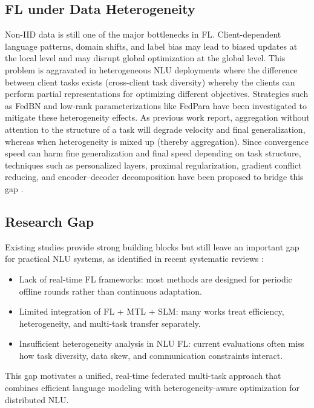\subsection{FL under Data Heterogeneity}
Non-IID data is still one of the major bottlenecks in FL. Client-dependent language patterns, domain shifts, and label bias may lead to biased updates at the local level and may disrupt global optimization at the global level. This problem is aggravated in heterogeneous NLU deployments where the difference between client tasks exists (cross-client task diversity) whereby the clients can perform partial representations for optimizing different objectives. Strategies such as FedBN \cite{li2021fedbn} and low-rank parameterizations like FedPara \cite{huo2022fedpara} have been investigated to mitigate these heterogeneity effects. As previous work report, aggregation without attention to the structure of a task will degrade velocity and final generalization, whereas when heterogeneity is mixed up (thereby aggregation). Since convergence speed can harm fine generalization and final speed depending on task structure, techniques such as personalized layers, proximal regularization, gradient conflict reducing, and encoder--decoder decomposition have been proposed to bridge this gap \cite{li2020fedprox,yu2020pcgrad,zhou2025mfed}.

\subsection{Research Gap}
Existing studies provide strong building blocks but still leave an important gap for practical NLU systems, as identified in recent systematic reviews \cite{khan2024systematic}:
\begin{itemize}
    \item Lack of real-time FL frameworks: most methods are designed for periodic offline rounds rather than continuous adaptation.
    \item Limited integration of FL + MTL + SLM: many works treat efficiency, heterogeneity, and multi-task transfer separately.
    \item Insufficient heterogeneity analysis in NLU FL: current evaluations often miss how task diversity, data skew, and communication constraints interact.
\end{itemize}
This gap motivates a unified, real-time federated multi-task approach that combines efficient language modeling with heterogeneity-aware optimization for distributed NLU.